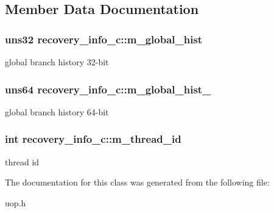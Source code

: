 \subsection{Member Data Documentation}
\hypertarget{classrecovery__info__c_aa4e7499fc8b15e669f054591f65ac457}{
\subsubsection[{m\_\-global\_\-hist}]{\setlength{\rightskip}{0pt plus 5cm}uns32 {\bf recovery\_\-info\_\-c::m\_\-global\_\-hist}}}
\label{classrecovery__info__c_aa4e7499fc8b15e669f054591f65ac457}
global branch history 32-\/bit \hypertarget{classrecovery__info__c_ae900e8c2b0de1acdfa6ddd05419d2ceb}{
\subsubsection[{m\_\-global\_\-hist\_\-64}]{\setlength{\rightskip}{0pt plus 5cm}uns64 {\bf recovery\_\-info\_\-c::m\_\-global\_\-hist\_}}}
\label{classrecovery__info__c_ae900e8c2b0de1acdfa6ddd05419d2ceb}
global branch history 64-\/bit \hypertarget{classrecovery__info__c_a2d39830ee723d6c7d34f3c7ced497bdf}{
\subsubsection[{m\_\-thread\_\-id}]{\setlength{\rightskip}{0pt plus 5cm}int {\bf recovery\_\-info\_\-c::m\_\-thread\_\-id}}}
\label{classrecovery__info__c_a2d39830ee723d6c7d34f3c7ced497bdf}
thread id 

The documentation for this class was generated from the following file:\begin{DoxyCompactItemize}
\item 
uop.h\end{DoxyCompactItemize}

